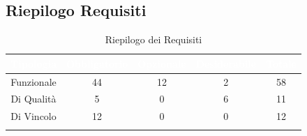 \subsection{Riepilogo Requisiti}\label{Riepilogo}
\begin{center}
\begin{longtable}[c]{|c|c|c|c|c|}
\hline
\rowcolor{bluelogo}\textbf{\textcolor{white}{Tipologia}} & \textbf{\textcolor{white}{Obbligatorio}} & \textbf{\textcolor{white}{Opzionale}} & \textbf{\textcolor{white}{Desiderabile}} & \textbf{\textcolor{white}{Totale}}\\
\hline \hline
\endhead
Funzionale & 44 & 12 & 2 & 58\\
\hline
\rowcolor{grigio}Di Qualità & 5 & 0 & 6 & 11\\
\hline
Di Vincolo & 12 & 0 & 0 & 12\\
\hline
\caption{Riepilogo dei Requisiti}
\end{longtable}
\end{center}